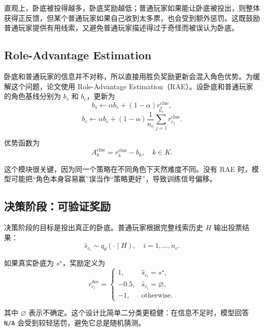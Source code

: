 直观上，卧底被投得越多，卧底奖励越低；普通玩家如果能让卧底被投出，则整体获得正反馈，但某个普通玩家如果自己收到太多票，也会受到额外惩罚。这既鼓励普通玩家提供有用线索，又避免普通玩家描述得过于奇怪而被误认为卧底。

\subsection{Role-Advantage Estimation}

卧底和普通玩家的信息并不对称，所以直接用胜负奖励更新会混入角色优势。为缓解这个问题，论文使用 Role-Advantage Estimation（RAE）。设卧底和普通玩家的角色基线分别为 $b_s$ 和 $b_c$，更新为
\begin{equation}
    b_s \leftarrow \alpha b_s + (1-\alpha) r_s^{\text{clue}},
\end{equation}
\begin{equation}
    b_c \leftarrow \alpha b_c + (1-\alpha)\frac{1}{n_c}\sum_{j=1}^{n_c}r_{c_j}^{\text{clue}}.
\end{equation}

优势函数为
\begin{equation}
    A_k^{\text{clue}} = r_k^{\text{clue}} - b_k, \quad k \in K.
\end{equation}

这个模块很关键，因为同一个策略在不同角色下天然难度不同。没有 RAE 时，模型可能把“角色本身容易赢”误当作“策略更好”，导致训练信号偏移。

\subsection{决策阶段：可验证奖励}

决策阶段的目标是投出真正的卧底。普通玩家根据完整线索历史 $H$ 输出投票结果：
\begin{equation}
    \hat{s}_{c_i} \sim q_{\theta}(\cdot \mid H), \quad i=1,\ldots,n_c.
\end{equation}

如果真实卧底为 $s^\star$，奖励定义为
\begin{equation}
    r_{c_i}^{\text{dec}} =
    \begin{cases}
        1, & \hat{s}_{c_i}=s^\star,\\
        -0.5, & \hat{s}_{c_i}=\varnothing,\\
        -1, & \text{otherwise}.
    \end{cases}
\end{equation}

其中 $\varnothing$ 表示不确定。这个设计比简单二分类更稳健：在信息不足时，模型回答 \texttt{N/A} 会受到较轻惩罚，避免它总是随机猜测。

